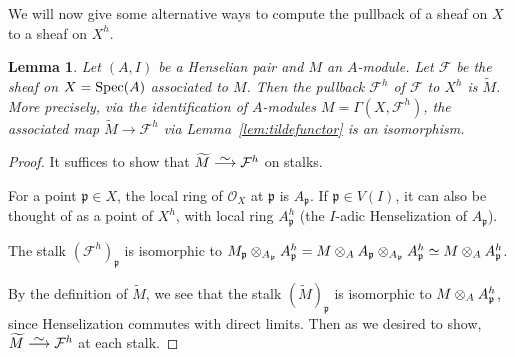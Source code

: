 \documentclass[12pt]{article}
\newcommand\simto{\stackrel{\textstyle\sim}{\smash{\longrightarrow}\rule{0pt}{0.4ex}}}
\renewcommand{\O}{\mathscr{O}}
\newcommand{\F}{\mathcal{F}}
\newcommand{\spec}{{\rm Spec}}
\newcommand{\mf}[1]{\mathfrak{#1}}
\newtheorem{lemma}[theorem]{Lemma}
\theoremstyle{definition}
\numberwithin{equation}{subsection}
\begin{document}
We will now give some alternative ways to compute the pullback of a sheaf on $X$ to a sheaf on $X^h$.
\begin{lemma}\label{lem:modpullback} Let $(A,I)$ be a Henselian pair and $M$ an $A$-module. Let $\F$ be the sheaf on $X=\spec(A)$ associated to $M$. Then the pullback $\F^h$ of $\F$ to $X^h$ is $\widetilde{M}$. More precisely, via the identification of $A$-modules $M=\Gamma(X,\F^h)$, the associated map $\widetilde{M} \to \F^h$ via Lemma~\ref{lem:tildefunctor} is an isomorphism. \end{lemma}
 \begin{proof} It suffices to show that  $\widetilde{M} \simto \F^h$ on stalks. 

For a point $\mf{p} \in X$, the local ring of $\O_X$ at $\mf{p}$ is $A_{\mf{p}}$. If $\mf{p} \in V(I)$, it can also be thought of as a point of $X^h$, with local ring $A_\mf{p}^h$ (the $I$-adic Henselization of $A_{\mf{p}}$).


The stalk $(\F^h)_{\mf{p}}$ is isomorphic to $M_\mf{p} \tens_{A_{\mf{p}}} A_{\mf{p}}^h = M \tens_A A_{\mf{p}} \tens_{A_{\mf{p}}} A_{\mf{p}}^h \simeq M \tens_A A_{\mf{p}}^h$. 

By the definition of $\widetilde{M}$, we see that the stalk $(\widetilde{M})_{\mf{p}}$ is isomorphic to $M \tens_A A_{\mf{p}}^h$, since Henselization commutes with direct limits. Then as we desired to show, $\widetilde{M} \simto \F^h$ at each stalk.\end{proof}
\end{document}
